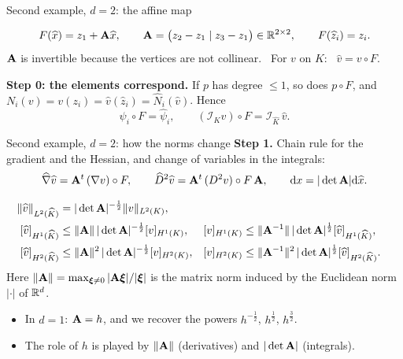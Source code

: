 \begin{frame}{Second example, $d = 2$: the affine map}
    \begin{center}
    \end{center}
    \[
        F(\widehat x) = z_1 + \mathbf{A} \widehat x, \qquad \mathbf{A} = \big( z_2 - z_1 \mid z_3 - z_1 \big) \in {\mathbb R}^{2\times 2}, \qquad F(\widehat z_i) = z_i .
    \]
    $\mathbf{A}$ is invertible because the vertices are not collinear. \ For $v$ on $K$: \ $\widehat v = v \circ F$.
    \medskip

    \textbf{Step 0: the elements correspond.} If $p$ has degree $\le 1$, so does $p \circ F$, and $N_i(v) = v(z_i) = \widehat v(\widehat z_i) = \widehat N_i(\widehat v)$. Hence
    \[
        \psi_i \circ F = \widehat\psi_i, \qquad (\mathcal I_K v)\circ F = \mathcal I_{\widehat K}\, \widehat v .
    \]
\end{frame}

\begin{frame}{Second example, $d = 2$: how the norms change}
    \small
    \textbf{Step 1.} Chain rule for the gradient and the Hessian, and change of variables in the integrals:
    \[
        \widehat\nabla \widehat v = \mathbf{A}^t\, (\nabla v)\circ F, \qquad
        \widehat D^2 \widehat v = \mathbf{A}^t\, (D^2 v)\circ F\, \mathbf{A}, \qquad
        {\mathrm d} x = |\det \mathbf{A}| {\mathrm d} \widehat x .
    \]
    \begin{lemma}
        \vspace{-\abovedisplayskip}
        \begin{align*}
            \|\widehat v\|_{L^2(\widehat K)} & = |\det\mathbf{A}|^{-\frac12} \|v\|_{L^2(K)},                                                                                                 \\
            [\widehat v]_{H^1(\widehat K)}   & \le \|\mathbf{A}\|\, |\det\mathbf{A}|^{-\frac12} [v]_{H^1(K)},
                                             & [v]_{H^1(K)}                                             & \le \|\mathbf{A}^{-1}\|\, |\det\mathbf{A}|^{\frac12} [\widehat v]_{H^1(\widehat K)},   \\
            [\widehat v]_{H^2(\widehat K)}   & \le \|\mathbf{A}\|^2\, |\det\mathbf{A}|^{-\frac12} [v]_{H^2(K)},
                                             & [v]_{H^2(K)}                                             & \le \|\mathbf{A}^{-1}\|^2\, |\det\mathbf{A}|^{\frac12} [\widehat v]_{H^2(\widehat K)}.
        \end{align*}
        Here $\|\mathbf{A}\| = \max_{\bm{\xi} \ne 0} |\mathbf{A}\bm{\xi}| / |\bm{\xi}|$ is the matrix norm induced by the Euclidean norm $|\cdot|$ of ${\mathbb R}^d$.
    \end{lemma}
    \begin{itemize}
        \item In $d = 1$: $\mathbf{A} = h$, and we recover the powers $h^{-\frac12}$, $h^{\frac12}$, $h^{\frac32}$.
        \item The role of $h$ is played by $\|\mathbf{A}\|$ (derivatives) and $|\det\mathbf{A}|$ (integrals).
    \end{itemize}
\end{frame}

